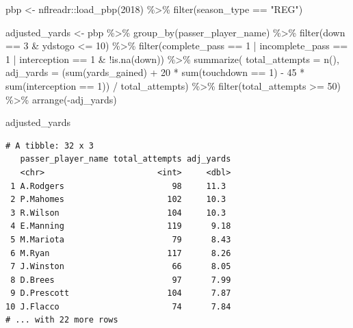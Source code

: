 \documentclass[
  letterpaper,
]{krantz}
\newenvironment{Shaded}{\begin{snugshade}}{\end{snugshade}}
\newcommand{\AttributeTok}[1]{\textcolor[rgb]{0.40,0.45,0.13}{#1}}
\newcommand{\DecValTok}[1]{\textcolor[rgb]{0.68,0.00,0.00}{#1}}
\newcommand{\FunctionTok}[1]{\textcolor[rgb]{0.28,0.35,0.67}{#1}}
\newcommand{\NormalTok}[1]{\textcolor[rgb]{0.00,0.23,0.31}{#1}}
\newcommand{\OtherTok}[1]{\textcolor[rgb]{0.00,0.23,0.31}{#1}}
\newcommand{\SpecialCharTok}[1]{\textcolor[rgb]{0.37,0.37,0.37}{#1}}
\newcommand{\StringTok}[1]{\textcolor[rgb]{0.13,0.47,0.30}{#1}}
\begin{document}
\begin{Shaded}
\begin{Highlighting}[]
\NormalTok{pbp }\OtherTok{\textless{}{-}}\NormalTok{ nflreadr}\SpecialCharTok{::}\FunctionTok{load\_pbp}\NormalTok{(}\DecValTok{2018}\NormalTok{) }\SpecialCharTok{\%\textgreater{}\%}
  \FunctionTok{filter}\NormalTok{(season\_type }\SpecialCharTok{==} \StringTok{"REG"}\NormalTok{)}

\NormalTok{adjusted\_yards }\OtherTok{\textless{}{-}}\NormalTok{ pbp }\SpecialCharTok{\%\textgreater{}\%}
  \FunctionTok{group\_by}\NormalTok{(passer\_player\_name) }\SpecialCharTok{\%\textgreater{}\%}
  \FunctionTok{filter}\NormalTok{(down }\SpecialCharTok{==} \DecValTok{3} \SpecialCharTok{\&}\NormalTok{ ydstogo }\SpecialCharTok{\textless{}=} \DecValTok{10}\NormalTok{) }\SpecialCharTok{\%\textgreater{}\%}
  \FunctionTok{filter}\NormalTok{(complete\_pass }\SpecialCharTok{==} \DecValTok{1} \SpecialCharTok{|}\NormalTok{ incomplete\_pass }\SpecialCharTok{==} \DecValTok{1} \SpecialCharTok{|}
\NormalTok{           interception }\SpecialCharTok{==} \DecValTok{1} \SpecialCharTok{\&} 
           \SpecialCharTok{!}\FunctionTok{is.na}\NormalTok{(down)) }\SpecialCharTok{\%\textgreater{}\%}
  \FunctionTok{summarize}\NormalTok{(}
    \AttributeTok{total\_attempts =} \FunctionTok{n}\NormalTok{(),}
    \AttributeTok{adj\_yards =}\NormalTok{ (}\FunctionTok{sum}\NormalTok{(yards\_gained) }\SpecialCharTok{+} \DecValTok{20} \SpecialCharTok{*} \FunctionTok{sum}\NormalTok{(touchdown }\SpecialCharTok{==} \DecValTok{1}\NormalTok{) }\SpecialCharTok{{-}} \DecValTok{45} \SpecialCharTok{*} 
                   \FunctionTok{sum}\NormalTok{(interception }\SpecialCharTok{==} \DecValTok{1}\NormalTok{)) }\SpecialCharTok{/}\NormalTok{ total\_attempts) }\SpecialCharTok{\%\textgreater{}\%}
  \FunctionTok{filter}\NormalTok{(total\_attempts }\SpecialCharTok{\textgreater{}=} \DecValTok{50}\NormalTok{) }\SpecialCharTok{\%\textgreater{}\%}
  \FunctionTok{arrange}\NormalTok{(}\SpecialCharTok{{-}}\NormalTok{adj\_yards)}

\NormalTok{adjusted\_yards}
\end{Highlighting}
\end{Shaded}

\begin{verbatim}
# A tibble: 32 x 3
   passer_player_name total_attempts adj_yards
   <chr>                       <int>     <dbl>
 1 A.Rodgers                      98     11.3 
 2 P.Mahomes                     102     10.3 
 3 R.Wilson                      104     10.3 
 4 E.Manning                     119      9.18
 5 M.Mariota                      79      8.43
 6 M.Ryan                        117      8.26
 7 J.Winston                      66      8.05
 8 D.Brees                        97      7.99
 9 D.Prescott                    104      7.87
10 J.Flacco                       74      7.84
# ... with 22 more rows
\end{verbatim}
\end{document}
